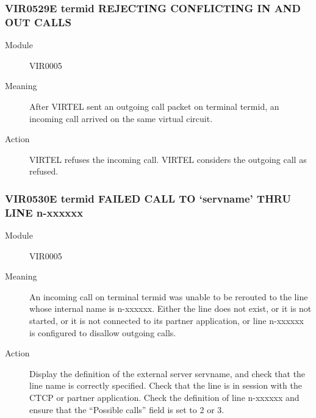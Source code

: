 \documentclass[letterpaper,10pt,english]{sphinxmanual}
\begin{document}
\subsubsection{VIR0529E termid REJECTING CONFLICTING IN AND OUT CALLS}
\label{\detokenize{messages:vir0529e-termid-rejecting-conflicting-in-and-out-calls}}\begin{description}
\item[{Module}] \leavevmode
VIR0005

\item[{Meaning}] \leavevmode
After VIRTEL sent an outgoing call packet on terminal termid, an incoming call arrived on the same virtual circuit.

\item[{Action}] \leavevmode
VIRTEL refuses the incoming call. VIRTEL considers the outgoing call as refused.

\end{description}


\subsubsection{VIR0530E termid FAILED CALL TO ‘servname’ THRU LINE n-xxxxxx}
\label{\detokenize{messages:vir0530e-termid-failed-call-to-servname-thru-line-n-xxxxxx}}\begin{description}
\item[{Module}] \leavevmode
VIR0005

\item[{Meaning}] \leavevmode
An incoming call on terminal termid was unable to be rerouted to the line whose internal name is n-xxxxxx. Either the line does not exist, or it is not started, or it is not connected to its partner application, or line n-xxxxxx is configured to disallow outgoing calls.

\item[{Action}] \leavevmode
Display the definition of the external server servname, and check that the line name is correctly specified. Check that the line is in session with the CTCP or partner application. Check the definition of line n-xxxxxx and ensure that the “Possible calls” field is set to 2 or 3.

\end{description}
\end{document}
